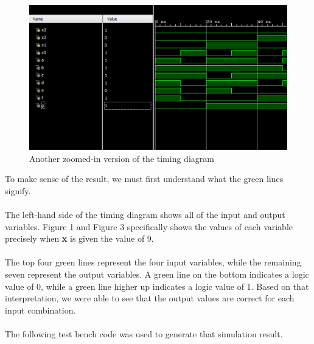 \documentclass{article}
\begin{document}
\clearpage

\begin{figure}[h!]
\centering
\includegraphics[scale=0.4]{Timing_Diagram-Magnified_IO}
\caption{Another zoomed-in version of the timing diagram}
\end{figure}

To make sense of the result, we must first understand what the green lines 
signify.\\
\\
The left-hand side of the timing diagram shows all of the input and output 
variables. Figure 1 and Figure 3 specifically shows the values of each variable 
precisely when \textbf{x} is given the value of 9. \\
\\
The top four green lines represent the four input variables, while the 
remaining seven represent the output variables. A green line on the bottom 
indicates a logic value of 0, while a green line higher up indicates a logic 
value of 1.  Based on that interpretation, we were able to see that the output 
values are correct for each input combination.\\
\\
The following test bench code was used to generate that simulation result.
\end{document}
